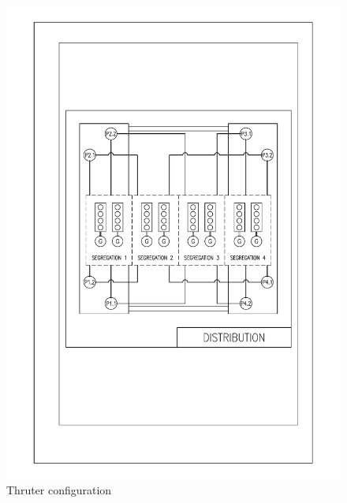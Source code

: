 \begin{figure}
    \centering
    \includegraphics[width = \textwidth]{figures/Single_Line_distribution.pdf}
    \caption{Thruter configuration}
    \label{fig:SingleLineDiagram}
\end{figure}

